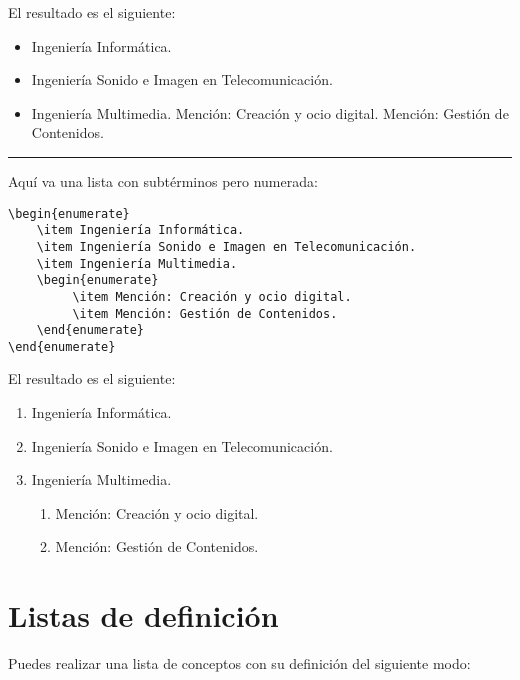 El resultado es el siguiente:
\begin{itemize}
    \item Ingeniería Informática.
    \item Ingeniería Sonido e Imagen en Telecomunicación.
    \item Ingeniería Multimedia.
         \subitem Mención: Creación y ocio digital.
         \subitem Mención: Gestión de Contenidos.
\end{itemize}
\vspace{1em}
\noindent\hrule
\vspace{1em}
Aquí va una lista con subtérminos pero numerada:
\begin{lstlisting}[style=Latex-color]
\begin{enumerate}
    \item Ingeniería Informática.
    \item Ingeniería Sonido e Imagen en Telecomunicación.
    \item Ingeniería Multimedia.
    \begin{enumerate}
         \item Mención: Creación y ocio digital.
         \item Mención: Gestión de Contenidos.
   	\end{enumerate}
\end{enumerate}
\end{lstlisting}

El resultado es el siguiente:
\begin{enumerate}
    \item Ingeniería Informática.
    \item Ingeniería Sonido e Imagen en Telecomunicación.
    \item Ingeniería Multimedia.
    \begin{enumerate}
         \item Mención: Creación y ocio digital.
         \item Mención: Gestión de Contenidos.
   	\end{enumerate}
\end{enumerate}

\section{Listas de definición}
 
 Puedes realizar una lista de conceptos con su definición del siguiente modo:
 
